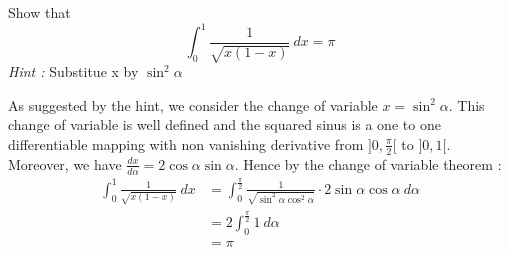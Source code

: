 \begin{exercise}[]{}
	Show that
\begin{equation*}
	\int_{{0}}^{{1}} {\frac{1}{\sqrt{x(1-x)}}} \: d{x} {} = \pi
\end{equation*}
\textit{Hint :} Substitue x by $ \sin^2\alpha$
\end{exercise}

\begin{solution}[]
	As suggested by the hint, we consider the change of variable $ x=\sin^2 \alpha $. This change of variable is well defined and the squared sinus is a one to one differentiable mapping with non vanishing derivative from $ ]0,\frac{\pi}{2}[ $ to $ ]0,1[ $. Moreover, we have $ \frac{dx}{d \alpha} = 2 \cos \alpha \sin \alpha $. Hence by the change of variable theorem :
\begin{align*}
	\int_{{0}}^{{1}} {\frac{1}{\sqrt{x(1-x)}}} \: d{x} {} &= \int_0^{\frac{\pi}{2}} \frac{1}{\sqrt{\sin^2 \alpha \cos^2 \alpha}} \cdot 2 \sin \alpha \cos \alpha \: d \alpha\\
							      &= 2 \int_{0}^{\frac{\pi}{2}} 1 \: d \alpha \\
							      &= \pi
\end{align*}


\end{solution}
